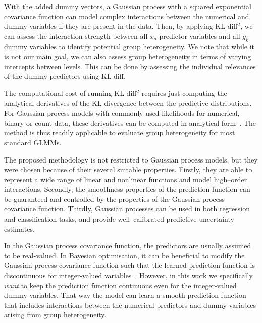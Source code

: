 \documentclass{article}
\begin{document}
%

With the added dummy vectors, a Gaussian process with a squared exponential covariance function can model complex interactions between the
numerical and dummy variables if they are present in the data.
Then, by applying KL-diff$^2$, we can assess the interaction strength between all $x_d$ predictor variables and all $g_k$ dummy variables to identify potential group heterogeneity.
We note that while it is not our main goal, we can also assess group heterogeneity in terms
of varying intercepts between levels. This can be done by assessing the individual relevances
of the dummy predictors using KL-diff.

The computational cost of running KL-diff$^2$ requires just computing the analytical derivatives of the KL divergence between the predictive distributions.
For Gaussian process models with commonly used likelihoods for numerical, binary or count data, these derivatives
can be computed in analytical form~\cite{paananen2019ranking}.
The method is thus readily applicable to evaluate group heterogeneity for most standard GLMMs.

The proposed methodology is not restricted to Gaussian process models,
but they were chosen because of their several suitable properties.
Firstly, they are able to represent a wide range of linear and nonlinear functions and model high--order interactions.
Secondly, the smoothness properties of the prediction function can be guaranteed and controlled
by the properties of the Gaussian process covariance function.
Thirdly, Gaussian processes can be used in both regression and classification tasks, and
provide well--calibrated predictive uncertainty estimates.


In the Gaussian process covariance function, the predictors are usually assumed to be real-valued.
In Bayesian optimisation, it can be beneficial to modify the Gaussian process covariance function
such that the learned prediction function is discontinuous for integer-valued
variables~\cite{garrido2020dealing}.
%
%
However, in this work
%
we specifically \emph{want} to keep the prediction function continuous even for the integer-valued dummy variables.
That way the model
can learn a smooth prediction function that includes interactions between the numerical predictors and dummy variables arising
from group heterogeneity.



%
%
%
%
%
%
%

%
%
%
%
%
%
%
%
%
%
%
%
%
\end{document}
